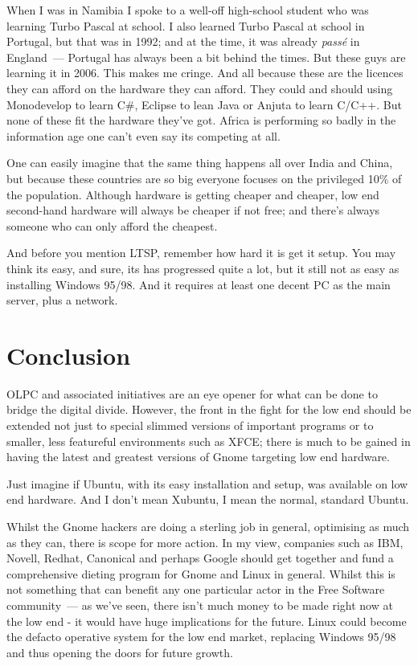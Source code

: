\documentclass{book}
\begin{document}
When I was in Namibia I spoke to a well-off high-school student who
was learning Turbo Pascal at school. I also learned Turbo Pascal at
school in Portugal, but that was in 1992; and at the time, it was already
\emph{pass\'e} in England~--- Portugal has always been a bit behind
the times. But these guys are learning it in 2006. This makes me
cringe. And all because these are the licences they can afford on the
hardware they can afford. They could and should using Monodevelop to
learn C\#, Eclipse to lean Java or Anjuta to learn C/C++. But none of
these fit the hardware they've got. Africa is performing so badly in
the information age one can't even say its competing at all.

One can easily imagine that the same thing happens all over India and
China, but because these countries are so big everyone focuses on the
privileged 10\% of the population. Although hardware is getting
cheaper and cheaper, low end second-hand hardware will always be
cheaper if not free; and there's always someone who can only afford
the cheapest.

And before you mention LTSP, remember how hard it is get it setup. You
may think its easy, and sure, its has progressed quite a lot, but it
still not as easy as installing Windows 95/98. And it requires at
least one decent PC as the main server, plus a network.

\section{Conclusion}

OLPC and associated initiatives are an eye opener for what can be done
to bridge the digital divide. However, the front in the fight for the
low end should be extended not just to special slimmed versions of
important programs or to smaller, less featureful environments such as
XFCE; there is much to be gained in having the latest and greatest
versions of Gnome targeting low end hardware.

Just imagine if Ubuntu, with its easy installation and setup, was
available on low end hardware. And I don't mean Xubuntu, I mean the
normal, standard Ubuntu.

Whilst the Gnome hackers are doing a sterling job in general,
optimising as much as they can, there is scope for more action. In my
view, companies such as IBM, Novell, Redhat, Canonical and perhaps
Google should get together and fund a comprehensive dieting program
for Gnome and Linux in general. Whilst this is not something that can
benefit any one particular actor in the Free Software community~--- as
we've seen, there isn't much money to be made right now at the low end
- it would have huge implications for the future. Linux could become
the defacto operative system for the low end market, replacing Windows
95/98 and thus opening the doors for future growth.
\end{document}
